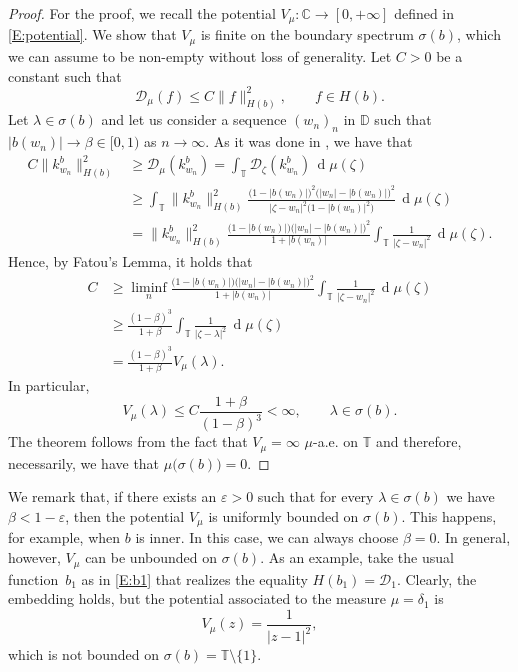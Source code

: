 \documentclass[12pt]{amsart}
\theoremstyle{definition}
\theoremstyle{remark}
\theoremstyle{remark}
\begin{document}
\begin{proof} 
For the proof, we recall the potential $V_\mu\colon\mathbb{C}\to[0,+\infty]$ defined in \eqref{E:potential}. We show that $V_\mu$ is finite on the boundary spectrum $\sigma(b)$, which we can assume to be non-empty without loss of generality. Let $C>0$ be a constant such that
\[\mathcal{D}_\mu(f) \leq C\|f\|_{H(b)}^2, \qquad f\in H(b).\]
Let $\lambda\in\sigma(b)$ and let us consider a sequence $(w_n)_n$ in $\mathbb{D}$ such that $|b(w_n)| \to \beta\in [0,1)$ as $n\to\infty$. As it was done in \cite{bellavita2023embedding}, we have that
\begin{align*}
    C\|k_{w_n}^b\|_{H(b)}^2&\geq    \mathcal{D}_\mu(k_{w_n}^b)=  \int_{\mathbb{T}} \mathcal{D}_\zeta(k_{w_n}^b) \,  \operatorname{d}\!\mu(\zeta) \\
    &\geq   \int_{\mathbb{T}} \|k_{w_n}^b\|_{H(b)}^2 \frac{\big(1-|b(w_n)|\big)^2 \big(|w_n| - |b(w_n)|\big)^2}{|\zeta-w_n|^2 \big(1-|b(w_n)|^2\big)} \, \operatorname{d}\!\mu(\zeta) \\
    &=   \|k_{w_n}^b\|^2_{H(b)} \frac{\big(1-|b(w_n)|\big)\big(|w_n| - |b(w_n)|\big)^2}{1+|b(w_n)|} \int_{\mathbb{T}} \frac{1}{|\zeta -w_n|^2}  \, \operatorname{d}\!\mu(\zeta) .
\end{align*}
Hence, by Fatou's Lemma, it holds that 
\begin{align*}
    C &\geq \liminf_{n} \frac{\big(1-|b(w_n)|\big)\big(|w_n| - |b(w_n)|\big)^2}{1+|b(w_n)|} \int_{\mathbb{T}} \frac{1}{|\zeta -w_n|^2}  \, \operatorname{d}\!\mu(\zeta) \\
    &\geq \frac{(1-\beta)^3}{1+\beta} \int_{\mathbb{T}} \frac{1}{|\zeta -\lambda|^2}  \, \operatorname{d}\!\mu(\zeta) \\
    &= \frac{(1-\beta)^3}{1+\beta} V_\mu(\lambda).
\end{align*}
In particular,
\[V_\mu(\lambda) \leq C \frac{1+\beta}{(1-\beta)^3} <\infty, \qquad \lambda\in\sigma(b).\]
The theorem follows from the fact that $V_\mu = \infty$ $\mu$-a.e. on $\mathbb{T}$ and therefore, necessarily, we have that $\mu\big(\sigma(b)\big)=0$.
\end{proof}


    We remark that, if there exists an $\varepsilon>0$ such that for every $\lambda\in\sigma(b)$ we have $\beta<1-\varepsilon$, then the potential $V_\mu$ is uniformly bounded on $\sigma(b)$. This happens, for example, when $b$ is inner. In this case, we can always choose $\beta=0$. In general, however, $V_\mu$ can be unbounded on $\sigma(b)$. As an example, take the usual function~$b_1$ as in \eqref{E:b1} that realizes the equality $H(b_1)=\mathcal{D}_1$. Clearly, the embedding holds, but the potential associated to the measure $\mu=\delta_1$ is
    \[V_\mu(z) = \frac{1}{|z-1|^2},\]
    which is not bounded on $\sigma(b)=\mathbb{T}\setminus\{1\}.$  
\end{document}
